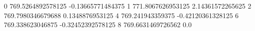 0 769.5264892578125 -0.13665771484375
1 771.8067626953125 2.14361572265625
2 769.7980346679688 0.1348876953125
4 769.241943359375 -0.42120361328125
6 769.338623046875 -0.32452392578125
8 769.6631469726562 0.0
